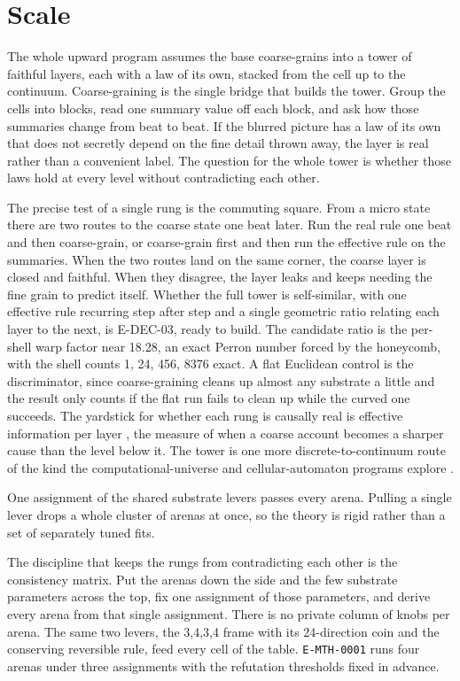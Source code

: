 \section{Scale}

The whole upward program assumes the base coarse-grains into a tower of faithful layers, each with a law of its own, stacked from the cell up to the continuum. Coarse-graining is the single bridge that builds the tower. Group the cells into blocks, read one summary value off each block, and ask how those summaries change from beat to beat. If the blurred picture has a law of its own that does not secretly depend on the fine detail thrown away, the layer is real rather than a convenient label. The question for the whole tower is whether those laws hold at every level without contradicting each other.

The precise test of a single rung is the commuting square. From a micro state there are two routes to the coarse state one beat later. Run the real rule one beat and then coarse-grain, or coarse-grain first and then run the effective rule on the summaries. When the two routes land on the same corner, the coarse layer is closed and faithful. When they disagree, the layer leaks and keeps needing the fine grain to predict itself. Whether the full tower is self-similar, with one effective rule recurring step after step and a single geometric ratio relating each layer to the next, is E-DEC-03, ready to build. The candidate ratio is the per-shell warp factor near 18.28, an exact Perron number forced by the honeycomb, with the shell counts 1, 24, 456, 8376 exact. A flat Euclidean control is the discriminator, since coarse-graining cleans up almost any substrate a little and the result only counts if the flat run fails to clean up while the curved one succeeds. The yardstick for whether each rung is causally real is effective information per layer \cite{hoel2013}, the measure of when a coarse account becomes a sharper cause than the level below it. The tower is one more discrete-to-continuum route of the kind the computational-universe and cellular-automaton programs explore \cite{lloyd2002, kari2005, ord2002}.

\begin{finding}
One assignment of the shared substrate levers passes every arena. Pulling a single lever drops a whole cluster of arenas at once, so the theory is rigid rather than a set of separately tuned fits.
\end{finding}

The discipline that keeps the rungs from contradicting each other is the consistency matrix. Put the arenas down the side and the few substrate parameters across the top, fix one assignment of those parameters, and derive every arena from that single assignment. There is no private column of knobs per arena. The same two levers, the {3,4,3,4} frame with its 24-direction coin and the conserving reversible rule, feed every cell of the table. \texttt{E-MTH-0001} runs four arenas under three assignments with the refutation thresholds fixed in advance.

